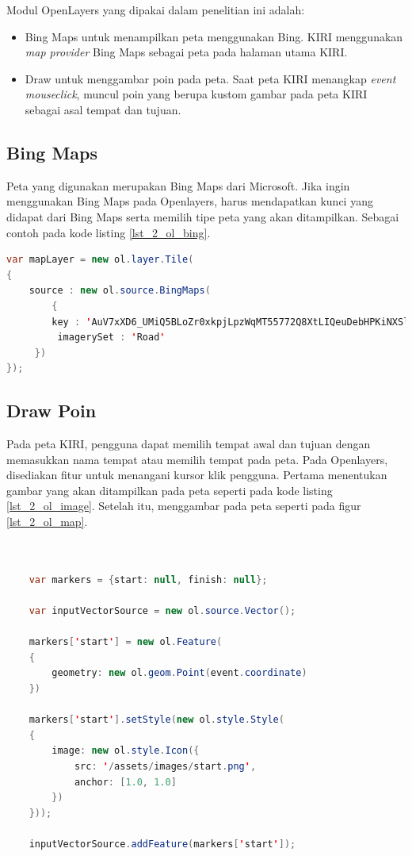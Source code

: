 Modul OpenLayers yang dipakai dalam penelitian ini adalah:
\begin{itemize}
	\item 	Bing Maps untuk menampilkan peta menggunakan Bing. KIRI menggunakan \textit{map provider} Bing Maps sebagai peta pada halaman utama KIRI. 
	\item Draw untuk menggambar poin pada peta. Saat peta KIRI menangkap \textit{event mouseclick}, muncul poin yang berupa kustom gambar pada peta KIRI sebagai asal tempat dan tujuan. 
\end{itemize}

\subsection{Bing Maps}
Peta yang digunakan merupakan Bing Maps dari Microsoft. Jika ingin menggunakan Bing Maps pada Openlayers, harus mendapatkan kunci yang didapat dari Bing Maps serta memilih tipe peta yang akan ditampilkan. Sebagai contoh pada kode listing \ref{lst_2_ol_bing}.

\begin{lstlisting}[caption=Penggunaan Bing Maps pada Openlayers,label = {lst_2_ol_bing},language=Java]
var mapLayer = new ol.layer.Tile(
{
	source : new ol.source.BingMaps(
    	{
     	key : 'AuV7xXD6_UMiQ5BLoZr0xkpjLpzWqMT55772Q8XtLIQeuDebHPKiNXSlZXxEr1GA',
         imagerySet : 'Road'
     })
});
\end{lstlisting}

\subsection{Draw Poin}
Pada peta KIRI, pengguna dapat memilih tempat awal dan tujuan dengan memasukkan nama tempat atau memilih tempat pada peta. Pada Openlayers, disediakan fitur untuk menangani kursor klik pengguna. Pertama menentukan gambar yang akan ditampilkan pada peta seperti pada kode listing \ref{lst_2_ol_image}. Setelah itu, menggambar pada peta seperti pada figur \ref{lst_2_ol_map}.


\begin{lstlisting}[caption=Menentukan gambar yang akan dipakai pada peta,label = {lst_2_ol_image},language=Java]

	
	var markers = {start: null, finish: null};
	
	var inputVectorSource = new ol.source.Vector();

	markers['start'] = new ol.Feature(
	{
		geometry: new ol.geom.Point(event.coordinate)
	})
	
	markers['start'].setStyle(new ol.style.Style(
	{
		image: new ol.style.Icon({
			src: '/assets/images/start.png',
			anchor: [1.0, 1.0]
		})
	}));
	
	inputVectorSource.addFeature(markers['start']);
	
	
\end{lstlisting}


